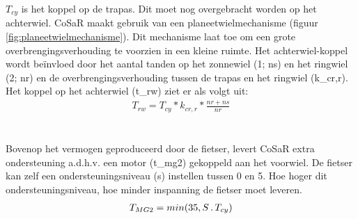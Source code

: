 \documentclass[12pt,a4paper,oneside]{book}
\begin{document}
\noindent $T_{cy}$ is het koppel op de trapas. Dit moet nog overgebracht worden op het achterwiel. CoSaR maakt gebruik van een planeetwielmechanisme (figuur \ref{fig:planeetwielmechanisme}). Dit mechanisme laat toe om een grote overbrengingsverhouding te voorzien in een kleine ruimte. Het achterwiel-koppel wordt beïnvloed door het aantal tanden op het zonnewiel (1; \gls{ns}) en het ringwiel (2; \gls{nr}) en de overbrengingsverhouding tussen de trapas en het ringwiel (\gls{k_cr,r}). Het koppel op het achterwiel (\gls{t_rw}) ziet er als volgt uit:
\begin{gather*}
T_{rw}=T_{cy}*k_{cr,r}*\frac{nr+ns}{nr}
\end{gather*}
\\\\
Bovenop het vermogen geproduceerd door de fietser, levert CoSaR extra ondersteuning a.d.h.v. een motor (\gls{t_mg2}) gekoppeld aan het voorwiel. De fietser kan zelf een ondersteuningsniveau (\gls{s}) instellen tussen 0 en 5. Hoe hoger dit ondersteuningsniveau, hoe minder inspanning de fietser moet leveren. 
\begin{gather*}
T_{MG2}=min(35,S\thinspace .\thinspace T_{cy})
\end{gather*}
\end{document}
